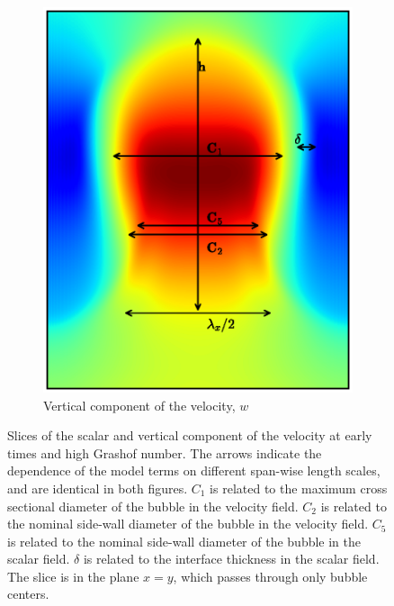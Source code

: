 \begin{figure}
\begin{subfigure}[b]{0.5\textwidth}
\includegraphics[width=\textwidth]{figs/slice_w}
\caption{Vertical component of the velocity, $w$}
\end{subfigure}
\caption{ 
Slices of the scalar and vertical component of the velocity at early times and high Grashof number.
The arrows indicate the dependence of the model terms on different span-wise length scales, and are identical in both figures.
$C_1$ is related to the maximum cross sectional diameter of the bubble in the velocity field.
$C_2$ is related to the nominal side-wall diameter of the bubble in the velocity field.
$C_5$ is related to the nominal side-wall diameter of the bubble in the scalar field.
$\delta$ is related to the interface thickness in the scalar field.
The slice is in the plane $x=y$, which passes through only bubble centers.
}
\end{figure}

